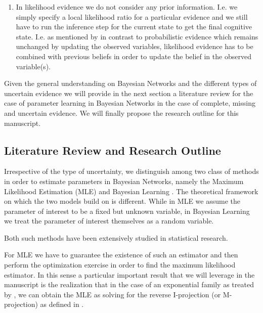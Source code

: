\documentclass[11pt]{article}
\begin{document}
\begin{article}
\begin{enumerate}
\item In likelihood evidence we do not consider any prior
information. I.e. we simply specify a local likelihood ratio for
a particular evidence and we still have to run the inference step
for the current state to get the final cognitive state. I.e. as
mentioned by \cite{Mrad_2015} in contrast to probabilistic evidence
which remains unchanged by updating the observed variables,
likelihood evidence has to be combined with previous beliefs in
order to update the belief in the observed variable(s).
\end{enumerate}

Given the general understanding on Bayesian Networks and the
different types of uncertain evidence we will provide in the next
section a literature review for the case of parameter learning in
Bayesian Networks in the case of complete, missing and uncertain
evidence. We will finally propose the research outline for this
manuscript. 

\subsection{Literature Review and Research Outline}
\label{sec:orgd41bf3d}

Irrespective of the type of uncertainty, we distinguish among two
class of methods in order to estimate parameters in Bayesian
Networks, namely the Maximum Likelihood Estimation (MLE)
\cite{spiegelhalter1990sequential} and Bayesian Learning
\cite{Smith_2001}. The theoretical framework on which the two models
build on is different. While in MLE we assume the parameter of
interest to be a fixed but unknown variable, in Bayesian Learning
we treat the parameter of interest themselves as a random
variable.

Both such methods have been extensively studied in statistical
research.

For MLE we have to guarantee the existence of such an estimator and
then perform the optimization exercise in order to find the maximum
likelihood estimator. In this sense a particular important result
that we will leverage in the manuscript is the realization that in
the case of an exponential family as treated by
\cite{barndorff1978hyperbolic}, we can obtain the MLE as solving for
the reverse I-projection (or M-projection) as defined in
\cite{csiszar1975divergence}.


\end{article}
\end{document}
